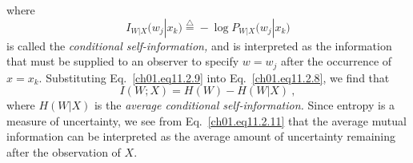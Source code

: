 where
\begin{equation}
        I_{W|X} \big(w_j | x_k \big) \stackrel{\triangle}{=}
        - \log
        P_{W|X} \big(w_j|x_k\big)
\label{ch01.11.2.10}
\end{equation}
is called the \textit{conditional self-information,} and is interpreted
as the information that must be supplied to an observer to specify $w= w_j$
after the occurrence of $x=x_k$.
Substituting Eq.~\eqref{ch01.eq11.2.9} into Eq.~\eqref{ch01.eq11.2.8},
we find that
\begin{equation}
  I(W;X) = H(W) - H(W|X)~,
\label{ch01.eq11.2.11}
\end{equation}
where $ H(W|X) $ is the \textit{average conditional self-information.}
Since entropy is a measure of uncertainty, we see from
Eq.~\eqref{ch01.eq11.2.11} that the average mutual information can be
interpreted as the average amount of uncertainty remaining after the
observation of $X$.


